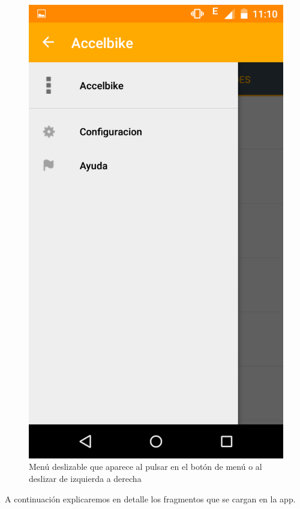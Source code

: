 \begin{figure}[h]%
	\centering
    \includegraphics[scale=0.2]{figures/app_menu_deslizable.png} %
    \caption[Menú deslizable de la aplicación Android]{Menú deslizable que aparece al pulsar en el botón de menú o al deslizar de izquierda a derecha}
   	\label{figuraAPPMenu}
\end{figure}

A continuación explicaremos en detalle los fragmentos que se cargan en la app.


